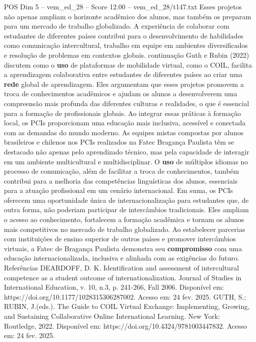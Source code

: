 \begin{textsample}{POS Dim 5 – vem\_ed\_28 – Score 12.00 – vem\_ed\_28/t147.txt}
Esses projetos não apenas ampliam o horizonte acadêmico dos alunos, mas também os preparam para um mercado de trabalho globalizado.
A experiência de colaborar com estudantes de diferentes países contribui para o desenvolvimento de habilidades como comunicação intercultural, trabalho em equipe em ambientes diversificados e resolução de problemas em contextos globais. continuação Guth e Rubin (2022) discutem como o \textbf{uso} de plataformas de mobilidade virtual, como o COIL, facilita a aprendizagem colaborativa entre estudantes de diferentes países ao criar uma \textbf{rede} global de aprendizagem.
Eles argumentam que esses projetos promovem a troca de conhecimentos acadêmicos e ajudam os alunos a desenvolverem uma compreensão mais profunda das diferentes culturas e realidades, o que é essencial para a formação de profissionais globais.
Ao integrar essas práticas à formação local, os PCIs proporcionam uma educação mais inclusiva, acessível e conectada com as demandas do mundo moderno.
As equipes mistas compostas por alunos brasileiros e chilenos nos PCIs realizados na Fatec Bragança Paulista têm se destacado não apenas pelo aprendizado técnico, mas pela capacidade de interagir em um ambiente multicultural e multidisciplinar.
O \textbf{uso} de múltiplos idiomas no processo de comunicação, além de facilitar a troca de conhecimentos, também contribui para a melhoria das competências linguísticas dos alunos, essenciais para a atuação profissional em um cenário internacional.
Em suma, os PCIs oferecem uma oportunidade única de internacionalização para estudantes que, de outra forma, não poderiam participar de intercâmbios tradicionais.
Eles ampliam o acesso ao conhecimento, fortalecem a formação acadêmica e tornam os alunos mais competitivos no mercado de trabalho globalizado.
Ao estabelecer parcerias com instituições de ensino superior de outros países e promover intercâmbios virtuais, a Fatec de Bragança Paulista demonstra seu \textbf{compromisso} com uma educação internacionalizada, inclusiva e alinhada com as exigências do futuro.
Referências DEARDOFF, D.
K.
Identification and assessment of intercultural competence as a student outcome of internationalization.
Journal of Studies in International Education, v. 10, n.3, p. 241-266, Fall 2006.
Disponível em: https://doi.org/10.1177/1028315306287002.
Acesso em: 24 fev. 2025.
GUTH, S.; RUBIN, J.(eds.).
The Guide to COIL Virtual Exchange: Implementing, Growing, and Sustaining Collaborative Online International Learning.
New York: Routledge, 2022.
Disponível em: https://doi.org/10.4324/9781003447832.
Acesso em: 24 fev. 2025.

\end{textsample}

